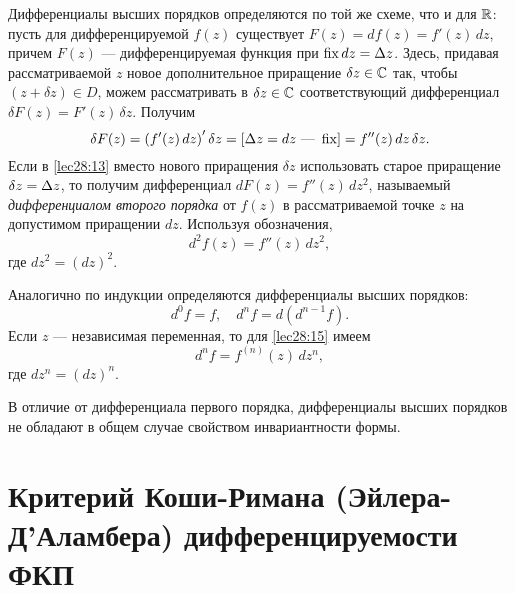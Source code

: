 \documentclass[../../main.tex]{subfiles}
\begin{document}
Дифференциалы высших порядков определяются по той же схеме, что и для $\mathbb{R}$:
пусть для дифференцируемой $f(z)$ существует $F(z) = d f(z) = f'(z)\, dz$, 
причем $F(z)$ --- дифференцируемая функция при $\operatorname{fix} dz = \Delta z$.
Здесь, придавая рассматриваемой
$z$ новое дополнительное приращение $\delta z \in \mathbb{C}$ так, чтобы
$\left(z + \delta z\right) \in D$, можем рассматривать в $\delta z \in \mathbb{C}$
соответствующий дифференциал $\delta F(z) = F'(z)\, \delta z$.
Получим
\begin{equation}
\label{lec28:13}
\delta F(z) = \left(f'(z)\, dz\right)' \delta z =
\left[\Delta z = dz \text{ --- } \operatorname{fix}\right] = f''(z)\, dz\, \delta z.
\end{equation}
Если в \eqref{lec28:13} вместо нового приращения $\delta z$ использовать
старое приращение $\delta z = \Delta z$, то получим дифференциал
$d F(z) = f''(z)\, dz^2$, называемый \emph{дифференциалом второго порядка}
от $f(z)$ в рассматриваемой точке $z$ на допустимом приращении $dz$.
Используя обозначения,
\begin{equation}
\label{lec28:14}
d^2 f(z) = f''(z)\, dz^2,
\end{equation}
где $dz^2 = (dz)^2$.

Аналогично по индукции определяются дифференциалы высших порядков:
\begin{equation}
\label{lec28:15}
d^0 f = f, \quad
d^n f = d \left(d^{n - 1} f \right).
\end{equation}
Если $z$ --- независимая переменная, то для \eqref{lec28:15} имеем
\begin{equation}
\label{lec28:16}
d^n f = f^{(n)} (z)\, dz^n,
\end{equation}
где $dz^n = (dz)^n$.

В отличие от дифференциала первого порядка,
дифференциалы высших порядков не обладают в общем случае свойством
инвариантности формы.

\section{Критерий Коши-Римана (Эйлера-Д'Аламбера) дифференцируемости ФКП}
\end{document}
